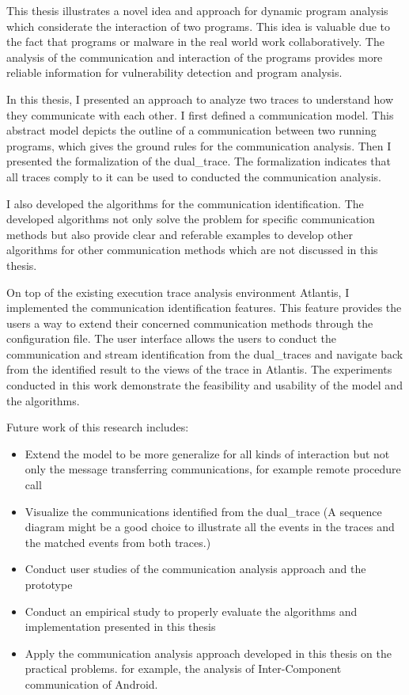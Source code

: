 \label{concl}
This thesis illustrates a novel idea and approach for dynamic program analysis which considerate the interaction of two programs. This idea is valuable due to the fact that programs or malware in the real world work collaboratively. The analysis of the communication and interaction of the programs provides more reliable information for vulnerability detection and program analysis.

In this thesis, I presented an approach to analyze two traces to understand how they communicate with each other. I first defined a communication model. This abstract model depicts the outline of a communication between two running programs, which gives the ground rules for the communication analysis. Then I presented the  formalization of the dual\_trace. The formalization indicates that all traces comply to it can be used to conducted the communication analysis.

I also developed the algorithms for the communication identification. The developed algorithms not only solve the problem for specific communication methods but also provide clear and referable examples to develop other algorithms for other communication methods which are not discussed in this thesis.

On top of the existing execution trace analysis environment Atlantis, I implemented the communication identification features. This feature provides the users a way to extend their concerned communication methods through the configuration file. The user interface allows the users to conduct the communication and stream identification from the dual\_traces and navigate back from the identified result to the views of the trace in Atlantis. The experiments conducted in this work demonstrate the feasibility and usability of the model and the algorithms. 


Future work of this research includes:
\begin{itemize}
\item Extend the model to be more generalize for all kinds of interaction but not only the message transferring communications, for example remote procedure call
\item Visualize the communications identified from the dual\_trace (A sequence diagram might be a good choice to illustrate all the events in the traces and the matched events from both traces.) 
\item Conduct user studies of the communication analysis approach and the prototype
\item Conduct an empirical study to properly evaluate the algorithms and implementation presented in this thesis
\item Apply the communication analysis approach developed in this thesis on the practical problems. for example, the analysis of Inter-Component communication of Android. 
\end{itemize}


